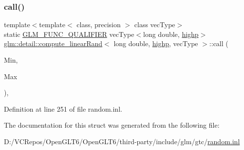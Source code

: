 \subsubsection{\texorpdfstring{call()}{call()}}
{\footnotesize\ttfamily template$<$template$<$ class, precision $>$ class vec\+Type$>$ \\
static \mbox{\hyperlink{setup_8hpp_a33fdea6f91c5f834105f7415e2a64407}{G\+L\+M\+\_\+\+F\+U\+N\+C\+\_\+\+Q\+U\+A\+L\+I\+F\+I\+ER}} vec\+Type$<$long double, \mbox{\hyperlink{namespaceglm_a0f04f086094c747d227af4425893f545ac6f7eab42eacbb10d59a58e95e362074}{highp}}$>$ \mbox{\hyperlink{structglm_1_1detail_1_1compute__linear_rand}{glm\+::detail\+::compute\+\_\+linear\+Rand}}$<$ long double, \mbox{\hyperlink{namespaceglm_a0f04f086094c747d227af4425893f545ac6f7eab42eacbb10d59a58e95e362074}{highp}}, vec\+Type $>$\+::call (\begin{DoxyParamCaption}\item[{vec\+Type$<$ long double, \mbox{\hyperlink{namespaceglm_a0f04f086094c747d227af4425893f545ac6f7eab42eacbb10d59a58e95e362074}{highp}} $>$ const \&}]{Min,  }\item[{vec\+Type$<$ long double, \mbox{\hyperlink{namespaceglm_a0f04f086094c747d227af4425893f545ac6f7eab42eacbb10d59a58e95e362074}{highp}} $>$ const \&}]{Max }\end{DoxyParamCaption})\hspace{0.3cm}{\ttfamily [inline]}, {\ttfamily [static]}}



Definition at line 251 of file random.\+inl.



The documentation for this struct was generated from the following file\+:\begin{DoxyCompactItemize}
\item 
D\+:/\+V\+C\+Repos/\+Open\+G\+L\+T6/\+Open\+G\+L\+T6/third-\/party/include/glm/gtc/\mbox{\hyperlink{random_8inl}{random.\+inl}}\end{DoxyCompactItemize}
